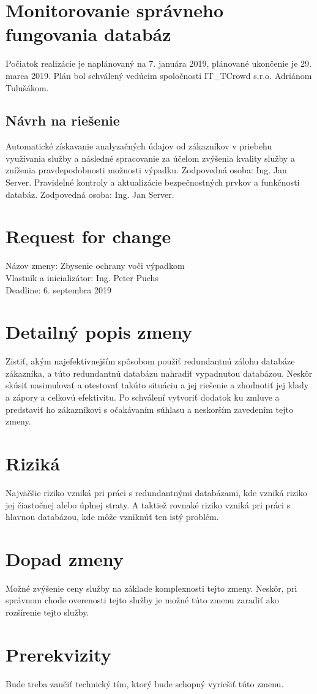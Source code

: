 \documentclass[a4paper, 11pt]{article}
\begin{document}
\section*{Monitorovanie správneho fungovania databáz}
Počiatok realizácie je naplánovaný na 7. januára 2019, plánované ukončenie je 29. marca 2019. Plán bol schválený vedúcim spoločnosti IT\_TCrowd s.r.o. Adriánom Tulušákom.

\subsection*{Návrh na riešenie}
Automatické získavanie analyzačných údajov od zákazníkov v priebehu využívania služby a následné spracovanie za účelom zvýšenia kvality služby a zníženia pravdepodobnosti možnosti výpadku. Zodpovedná osoba: Ing. Jan Server.
Pravidelné kontroly a aktualizácie bezpečnostných prvkov a funkčnosti databáz. Zodpovedná osoba: Ing. Jan Server.

\section*{Request for change}
Názov zmeny: Zbysenie ochrany voči výpadkom\\
Vlastník a inicializátor: Ing. Peter Puchs\\
Deadline: 6. septembra 2019

\section*{Detailný popis zmeny}
Zistiť, akým najefektívnejším spôsobom použiť redundantnú zálohu databáze zákazníka, a túto redundantnú databázu nahradiť vypadnutou databázou. Neskôr skúsiť nasimulovať a otestovať takúto situáciu a jej riešenie a zhodnotiť jej klady a zápory a celkovú efektivitu. Po schválení vytvoriť dodatok ku zmluve a predstaviť ho zákazníkovi s očakávaním súhlasu a neskorším zavedením tejto zmeny.

\section*{Riziká}
Najväčšie riziko vzniká pri práci s redundantnými databázami, kde vzniká riziko jej čiastočnej alebo úplnej straty. A taktiež rovnaké riziko vzniká pri práci s hlavnou databázou, kde môže vzniknúť ten istý problém.

\section*{Dopad zmeny}
Možné zvýšenie ceny služby na základe komplexnosti tejto zmeny. Neskôr, pri správnom chode overenosti tejto služby je možné túto zmenu zaradiť ako rozšírenie tejto služby.

\section*{Prerekvizity}
Bude treba zaučiť technický tím, ktorý bude schopný vyriešiť túto zmenu.
\end{document}

